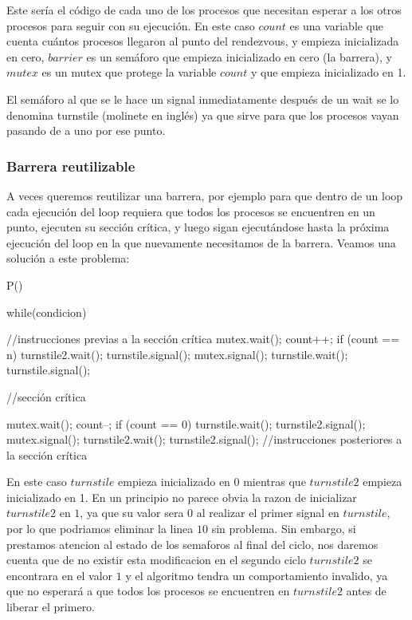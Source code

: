 \documentclass{article}
\begin{document}
Este ser\'ia el c\'odigo de cada uno de los procesos que necesitan esperar a los otros procesos para seguir con su ejecuci\'on. En este caso $count$ es una variable que cuenta cu\'antos procesos llegaron al punto del rendezvous, y empieza inicializada en cero, $barrier$ es un sem\'aforo que empieza inicializado en cero (la barrera), y $mutex$ es un mutex que protege la variable $count$ y que empieza inicializado en 1.

El sem\'aforo al que se le hace un signal inmediatamente despu\'es de un wait se lo denomina turnstile (molinete en ingl\'es) ya que sirve para que los procesos vayan pasando de a uno por ese punto.

\subsubsection{Barrera reutilizable}

A veces queremos reutilizar una barrera, por ejemplo para que dentro de un loop cada ejecuci\'on del loop requiera que todos los procesos se encuentren en un punto, ejecuten su secci\'on cr\'itica, y luego sigan ejecut\'andose hasta la pr\'oxima ejecuci\'on del loop en la que nuevamente necesitamos de la barrera. Veamos una soluci\'on a este problema:

\begin{code}
P()
{
    while(condicion)
		{
		    //instrucciones previas a la sección crítica
		    mutex.wait();
				    count++;
						if (count == n)
						{
						    turnstile2.wait();
								turnstile.signal();
						}
				mutex.signal();
				turnstile.wait();
				turnstile.signal();
				
				//sección crítica
				
				mutex.wait();
				    count--;
						if (count == 0)
						{
						    turnstile.wait();
								turnstile2.signal();
						}
				mutex.signal();
				turnstile2.wait();
				turnstile2.signal();
				//instrucciones posteriores a la sección crítica
		}
}
\end{code}

En este caso $turnstile$ empieza inicializado en 0 mientras que $turnstile2$ empieza inicializado en 1. En un principio no parece obvia la razon de inicializar $turnstile2$ en $1$, ya que su valor sera $0$ al realizar el primer signal en $turnstile$, por lo que podriamos eliminar la linea $10$ sin problema. Sin embargo, si prestamos atencion al estado de los semaforos al final del ciclo, nos daremos cuenta que de no existir esta modificacion en el segundo ciclo $turnstile2$ se encontrara en el valor $1$ y el algoritmo tendra un comportamiento invalido, ya que no esperará a que todos los procesos se encuentren en $turnstile2$ antes de liberar el primero.
\end{document}
